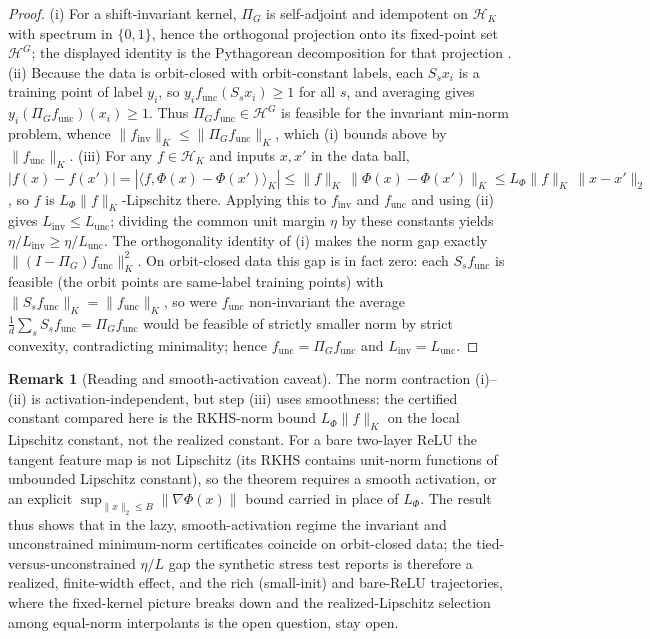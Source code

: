 \documentclass{article}
\theoremstyle{definition}
\newtheorem{remark}{Remark}
\newcommand{\dd}{d}
\begin{document}
\begin{proof}
(i) For a shift-invariant kernel, $\Pi_G$ is self-adjoint and idempotent on $\mathcal H_K$
with spectrum in $\{0,1\}$, hence the orthogonal projection onto its fixed-point set
$\mathcal H^G$; the displayed identity is the Pythagorean decomposition for that projection
\citep{elesedy2021provably}.
(ii) Because the data is orbit-closed with orbit-constant labels, each $S_s x_i$ is a
training point of label $y_i$, so $y_i f_{\mathrm{unc}}(S_s x_i)\ge1$ for all $s$, and
averaging gives $y_i(\Pi_G f_{\mathrm{unc}})(x_i)\ge1$. Thus $\Pi_G f_{\mathrm{unc}}\in
\mathcal H^G$ is feasible for the invariant min-norm problem, whence
$\|f_{\mathrm{inv}}\|_K\le\|\Pi_G f_{\mathrm{unc}}\|_K$, which (i) bounds above by
$\|f_{\mathrm{unc}}\|_K$.
(iii) For any $f\in\mathcal H_K$ and inputs $x,x'$ in the data ball,
$|f(x)-f(x')|=|\langle f,\Phi(x)-\Phi(x')\rangle_K|\le\|f\|_K\,\|\Phi(x)-\Phi(x')\|_K\le
L_\Phi\|f\|_K\,\|x-x'\|_2$, so $f$ is $L_\Phi\|f\|_K$-Lipschitz there. Applying this to
$f_{\mathrm{inv}}$ and $f_{\mathrm{unc}}$ and using (ii) gives $L_{\mathrm{inv}}\le
L_{\mathrm{unc}}$; dividing the common unit margin $\eta$ by these constants yields
$\eta/L_{\mathrm{inv}}\ge\eta/L_{\mathrm{unc}}$. The orthogonality identity of (i) makes the
norm gap exactly $\|(I-\Pi_G)f_{\mathrm{unc}}\|_K^2$. On orbit-closed data this gap is in fact
zero: each $S_s f_{\mathrm{unc}}$ is feasible (the orbit points are same-label training points)
with $\|S_s f_{\mathrm{unc}}\|_K=\|f_{\mathrm{unc}}\|_K$, so were $f_{\mathrm{unc}}$ non-invariant
the average $\tfrac1\dd\sum_s S_s f_{\mathrm{unc}}=\Pi_G f_{\mathrm{unc}}$ would be feasible of
strictly smaller norm by strict convexity, contradicting minimality; hence
$f_{\mathrm{unc}}=\Pi_G f_{\mathrm{unc}}$ and $L_{\mathrm{inv}}=L_{\mathrm{unc}}$.
\end{proof}

\begin{remark}[Reading and smooth-activation caveat]\label{rem:lazy-relu}
The norm contraction (i)--(ii) is activation-independent, but step (iii) uses smoothness:
the certified constant compared here is the RKHS-norm bound $L_\Phi\|f\|_K$ on the local
Lipschitz constant, not the realized constant. For a bare two-layer ReLU the tangent
feature map is not Lipschitz \citep{bietti2019inductive} (its RKHS contains unit-norm
functions of unbounded Lipschitz constant), so the theorem requires a smooth activation, or
an explicit $\sup_{\|x\|_2\le B}\|\nabla\Phi(x)\|$ bound carried in place of $L_\Phi$. The
result thus shows that in the lazy, smooth-activation regime the invariant and unconstrained
minimum-norm certificates coincide on orbit-closed data; the tied-versus-unconstrained
$\eta/L$ gap the synthetic stress test reports is therefore a realized, finite-width effect, and
the rich (small-init) and bare-ReLU trajectories, where the fixed-kernel picture breaks down
\citep{chizat2019lazy} and the realized-Lipschitz selection among equal-norm interpolants is the
open question, stay open.
\end{remark}
\end{document}
